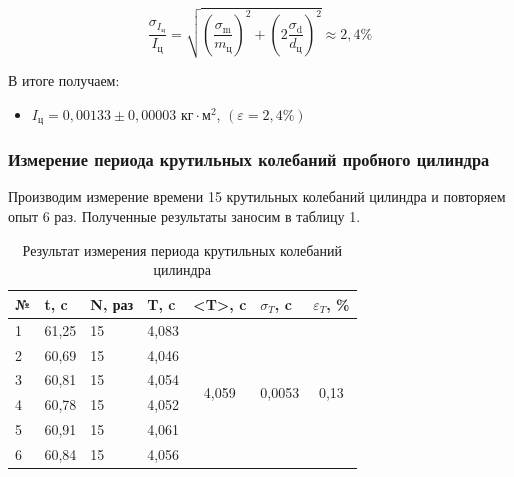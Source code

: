 \[
\frac{\sigma_{I_\text{ц}}}{I_\text{ц}} = \sqrt{\left( \frac{\sigma_\text{m}}{m_\text{ц}} \right)^2 + \left(2 \frac{\sigma_\text{d}}{d_\text{ц}} \right)^2 } \approx 2,4 \%
\]

    В итоге получаем:

\begin{itemize}
	\item {$ I_\text{ц} = 0,00133 \pm 0,00003  \text{ кг} \cdot \text{м}^2 $, $ \left( \varepsilon =  2,4\% \right) $}
\end{itemize}






\subsubsection{Измерение периода крутильных колебаний пробного цилиндра}

    Производим измерение времени 15 крутильных колебаний цилиндра и повторяем опыт 6 раз. Полученные результаты заносим в таблицу 1.


\begin{table}[H]
\centering
\begin{tabular}{|l|l|l|l|c|c|c|}
\hline
№ & t, c  & N, раз & T, c  & \multicolumn{1}{l|}{\textless{}T\textgreater{}, c} & \multicolumn{1}{l|}{$\sigma_T$, c} & \multicolumn{1}{l|}{$\varepsilon_T$, \%} \\ \hline
1 & 61,25 & 15     & 4,083 & \multirow{6}{*}{4,059}                             & \multirow{6}{*}{0,0053}         & \multirow{6}{*}{0,13}                 \\ \cline{1-4}
2 & 60,69 & 15     & 4,046 &                                                    &                                 &                                       \\ \cline{1-4}
3 & 60,81 & 15     & 4,054 &                                                    &                                 &                                       \\ \cline{1-4}
4 & 60,78 & 15     & 4,052 &                                                    &                                 &                                       \\ \cline{1-4}
5 & 60,91 & 15     & 4,061 &                                                    &                                 &                                       \\ \cline{1-4}
6 & 60,84 & 15     & 4,056 &                                                    &                                 &                                       \\ \hline
\end{tabular}
\caption{Результат измерения периода крутильных колебаний цилиндра}
\end{table}

